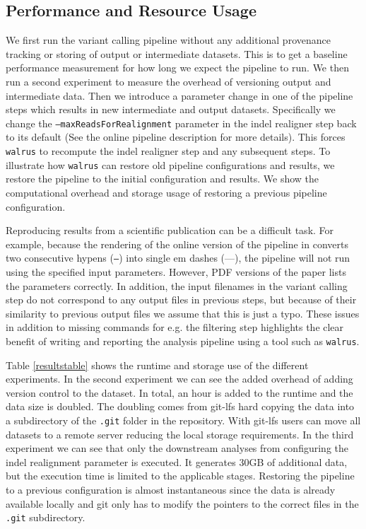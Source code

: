 \subsection{Performance and Resource Usage}
We first run the variant calling pipeline without any additional provenance
tracking or storing of output or intermediate datasets. This is to get a
baseline performance measurement for how long we expect the pipeline to run. We
then run a second experiment to measure the overhead of versioning output and
intermediate data. Then we introduce a parameter change in one of the pipeline
steps which results in new intermediate and output datasets. Specifically we
change the \texttt{--maxReadsForRealignment} parameter in the indel realigner
step back to its default (See the online pipeline description for more details).
This forces \texttt{walrus} to recompute the indel realigner step and any
subsequent steps.  To illustrate how \texttt{walrus} can restore old pipeline
configurations and results, we restore the pipeline to the initial configuration
and results. We show the computational overhead and storage usage of restoring a
previous pipeline configuration. 

Reproducing results from a scientific publication can be a difficult task. For
example, because the rendering of the online version of the pipeline in
\cite{cornish2015comparison} converts two consecutive hypens (\texttt{--})
into single em dashes (---), the pipeline will not run using the specified input
parameters. However, PDF versions of the paper lists the parameters correctly.
In addition, the input filenames in the variant calling step do not correspond
to any output files in previous steps, but because of their similarity to
previous output files we assume that this is just a typo.  These issues in
addition to missing commands for e.g. the filtering step highlights the clear
benefit of writing and reporting the analysis pipeline using a tool such as
\texttt{walrus}. 

Table \ref{resultstable} shows the runtime and storage use of the different
experiments. In the second experiment we can see the added overhead of adding
version control to the dataset. In total, an hour is added to the runtime and
the data size is doubled. The doubling comes from git-lfs hard copying the data
into a subdirectory of the \texttt{.git} folder in the repository. With git-lfs
users can move all datasets to a remote server reducing the local storage
requirements. 
In the third experiment we can see that only the downstream analyses from
configuring the indel realignment parameter is executed. It generates 30GB of
additional data, but the execution time is limited to the applicable stages.
Restoring the pipeline to a previous configuration is almost instantaneous since
the data is already available locally and git only has to modify the pointers to
the correct files in the \texttt{.git} subdirectory. 


